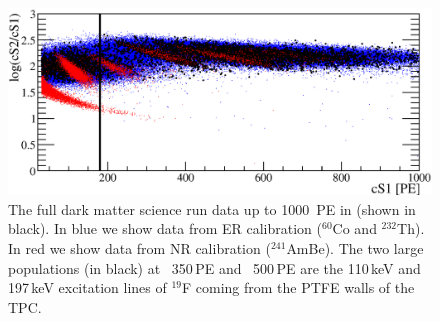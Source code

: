 \begin{figure}
\centerline{\includegraphics[width=1.\linewidth]
{Figures/allDataFullScale.eps}}
\caption{The full \Xehund{} dark matter science run data up to 1000~PE in \cSi{} (shown in black). In blue we show data from ER calibration ($^{60}$Co and $^{232}$Th). In red we show data from NR calibration ($^{241}$AmBe). The two large populations (in black) at ~350\,PE and ~500\,PE are the 110\,keV and 197\,keV excitation lines of $^{19}$F coming from the PTFE walls of the TPC.  
}
\label{fig:eft_1000}
\end{figure}  






